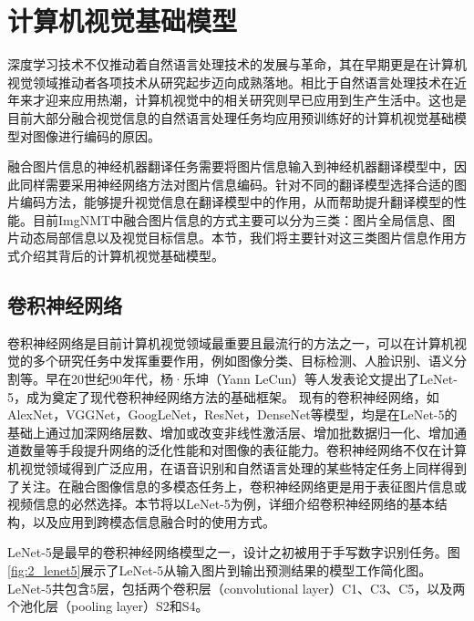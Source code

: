 \section{计算机视觉基础模型}
\label{sec:2_cv}

深度学习技术不仅推动着自然语言处理技术的发展与革命，其在早期更是在计算机视觉领域推动者各项技术从研究起步迈向成熟落地。相比于自然语言处理技术在近年来才迎来应用热潮，计算机视觉中的相关研究则早已应用到生产生活中。这也是目前大部分融合视觉信息的自然语言处理任务均应用预训练好的计算机视觉基础模型对图像进行编码的原因。

融合图片信息的神经机器翻译任务需要将图片信息输入到神经机器翻译模型中，因此同样需要采用神经网络方法对图片信息编码。针对不同的翻译模型选择合适的图片编码方法，能够提升视觉信息在翻译模型中的作用，从而帮助提升翻译模型的性能。目前ImgNMT中融合图片信息的方式主要可以分为三类：图片全局信息、图片动态局部信息以及视觉目标信息。本节，我们将主要针对这三类图片信息作用方式介绍其背后的计算机视觉基础模型。


\subsection{卷积神经网络}
\label{sec:2_cnn}

卷积神经网络是目前计算机视觉领域最重要且最流行的方法之一，可以在计算机视觉的多个研究任务中发挥重要作用，例如图像分类、目标检测、人脸识别、语义分割等。早在20世纪90年代，杨·乐坤（Yann LeCun）等人发表论文提出了LeNet-5，成为奠定了现代卷积神经网络方法的基础框架。
现有的卷积神经网络，如AlexNet，VGGNet，GoogLeNet，ResNet，DenseNet等模型，均是在LeNet-5的基础上通过加深网络层数、增加或改变非线性激活层、增加批数据归一化、增加通道数量等手段提升网络的泛化性能和对图像的表征能力。卷积神经网络不仅在计算机视觉领域得到广泛应用，在语音识别和自然语言处理的某些特定任务上同样得到了关注。在融合图像信息的多模态任务上，卷积神经网络更是用于表征图片信息或视频信息的必然选择。本节将以LeNet-5为例，详细介绍卷积神经网络的基本结构，以及应用到跨模态信息融合时的使用方式。


LeNet-5是最早的卷积神经网络模型之一，设计之初被用于手写数字识别任务。图\ref{fig:2_lenet5}展示了LeNet-5从输入图片到输出预测结果的模型工作简化图。LeNet-5共包含5层，包括两个卷积层（convolutional layer）C1、C3、C5，以及两个池化层（pooling layer）S2和S4。

